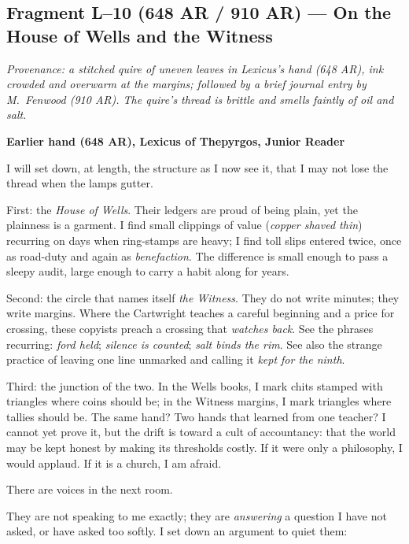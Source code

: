 \documentclass[11pt]{article}
\begin{document}
\subsection*{Fragment L--10 (648 AR / 910 AR) --- On the House of Wells and the Witness}
\label{frag:l10}
{}

\noindent\textit{Provenance: a stitched quire of uneven leaves in Lexicus’s hand (648 AR), ink crowded and overwarm at the margins; followed by a brief journal entry by M.\ Fenwood (910 AR). The quire’s thread is brittle and smells faintly of oil and salt.}

\medskip
\noindent\textbf{Earlier hand (648 AR), Lexicus of Thepyrgos, Junior Reader}

I will set down, at length, the structure as I now see it, that I may not lose the thread when the lamps gutter.

First: the \textit{House of Wells}. Their ledgers are proud of being plain, yet the plainness is a garment. I find small clippings of value (\emph{copper shaved thin}) recurring on days when ring-stamps are heavy; I find toll slips entered twice, once as road-duty and again as \emph{benefaction}. The difference is small enough to pass a sleepy audit, large enough to carry a habit along for years.

Second: the circle that names itself \textit{the Witness}. They do not write minutes; they write margins. Where the Cartwright teaches a careful beginning and a price for crossing, these copyists preach a crossing that \emph{watches back}. See the phrases recurring: \emph{ford held}; \emph{silence is counted}; \emph{salt binds the rim}. See also the strange practice of leaving one line unmarked and calling it \emph{kept for the ninth}.

Third: the junction of the two. In the Wells books, I mark chits stamped with triangles where coins should be; in the Witness margins, I mark triangles where tallies should be. The same hand? Two hands that learned from one teacher? I cannot yet prove it, but the drift is toward a cult of accountancy: that the world may be kept honest by making its thresholds costly. If it were only a philosophy, I would applaud. If it is a church, I am afraid.

There are voices in the next room.

They are not speaking to me exactly; they are \emph{answering} a question I have not asked, or have asked too softly. I set down an argument to quiet them:
\end{document}
